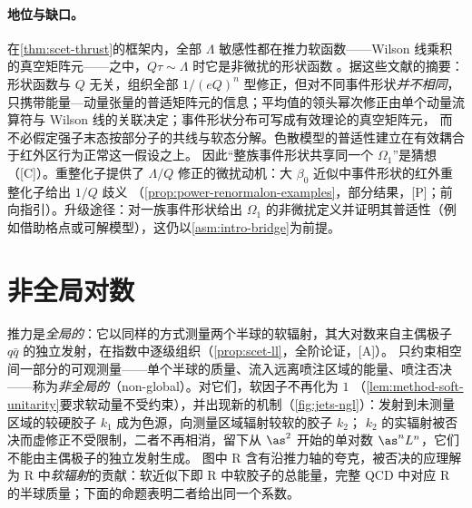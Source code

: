 \paragraph{地位与缺口。}
在\cref{thm:scet-thrust}的框架内，全部 $\Lambda$ 敏感性都在推力软函数——Wilson 线乘积的真空矩阵元——之中，$Q\tau\sim\Lambda$ 时它是非微扰的形状函数
\cite{Korchemsky:1994is,Korchemsky:1999kt,Bauer:2003di,Lee:2006nr,Bauer:2008dt}。据这些文献的摘要：形状函数与 $Q$ 无关，组织全部 $1/(eQ)^n$ 型修正，但对不同事件形状\emph{并不相同}，
只携带能量—动量张量的普适矩阵元的信息\cite{Korchemsky:1999kt}；平均值的领头幂次修正由单个动量流算符与 Wilson 线的关联决定\cite{Lee:2006nr}；事件形状分布可写成有效理论的真空矩阵元，
而不必假定强子末态按部分子的共线与软态分解\cite{Bauer:2008dt}。色散模型的普适性建立在有效耦合于红外区行为正常这一假设之上\cite{DokshitzerWebber1995}。
因此“整族事件形状共享同一个 $\Omega_1$”是猜想（[C]）。重整化子提供了 $\Lambda/Q$ 修正的微扰动机：大 $\beta_0$ 近似中事件形状的红外重整化子给出 $1/Q$ 歧义
（\cref{prop:power-renormalon-examples}，部分结果，[P]；前向指引）。升级途径：对一族事件形状给出 $\Omega_1$ 的非微扰定义并证明其普适性（例如借助格点或可解模型），这仍以\cref{asm:intro-bridge}为前提。
\section{非全局对数}\label{sec:jets-ngl}

推力是\emph{全局的}：它以同样的方式测量两个半球的软辐射，其大对数来自主偶极子 $q\bar q$ 的独立发射，在指数中逐级组织（\cref{prop:scet-ll}，全阶论证，[A]）。
只约束相空间一部分的可观测量——单个半球的质量、流入远离喷注区域的能量、喷注否决——称为\emph{非全局的}（non-global）。对它们，软因子不再化为 $1$
（\cref{lem:method-soft-unitarity}要求软动量不受约束），并出现新的机制（\cref{fig:jets-ngl}）：发射到未测量区域的较硬胶子 $k_1$ 成为色源，向测量区域辐射较软的胶子 $k_2$；
$k_2$ 的实辐射被否决而虚修正不受限制，二者不再相消，留下从 $\as^2$ 开始的单对数 $\as^nL^n$，它们不能由主偶极子的独立发射生成\cite{DasguptaSalam2001}。
图中 R 含有沿推力轴的夸克，被否决的应理解为 R 中\emph{软辐射}的贡献：软近似下即 R 中软胶子的总能量，完整 QCD 中对应 R 的半球质量；下面的命题表明二者给出同一个系数。


